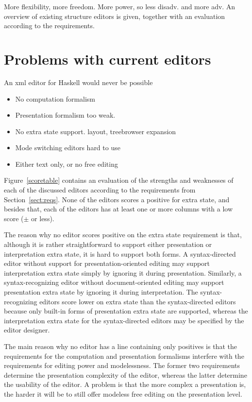 \documentclass{speauth}
\begin{document}
\cbend


 
\bc
More flexibility, more freedom. More power, so less disadv. and more adv. An overview of existing structure editors is given, together with an evaluation according to the requirements. 

\section{Problems with current editors}
An xml editor for Haskell would never be possible
\begin{itemize}
\item No computation formalism
\item Presentation formalism too weak. 
\item No extra state support. layout, treebrowser expansion
\item Mode switching editors hard to use
\item Either text only, or no free editing
\end{itemize}
\ec

Figure~\ref{scoretable} contains an evaluation of the strengths and weaknesses of each of the discussed editors according to the requirements from Section~\ref{sect:reqs}. None of the editors scores a positive for extra state, and besides that, each of the editors has at least one or more columns with a low score ($\pm$ or less). 

The reason why no editor scores positive on the extra state requirement is that, although it is rather straightforward to support either presentation or interpretation extra state, it is hard to support both forms. A syntax-directed editor without support for presentation-oriented editing may support interpretation extra state simply by ignoring it during presentation. Similarly, a syntax-recognizing editor without document-oriented editing may support presentation extra state by ignoring it during interpretation. The syntax-recognizing editors score lower on extra state than the syntax-directed editors because only built-in forms of presentation extra state are supported, whereas the interpretation extra state for the syntax-directed editors may be specified by the editor designer.

The main reason why no editor has a line containing only positives is that the requirements for the computation and presentation formalisms interfere with the requirements for editing power and modelessness. The former two requirements determine the presentation complexity of the editor, whereas the latter determine the usability of the editor. A problem is that the more complex a presentation is, the harder it will be to still offer modeless free editing on the presentation level.
\end{document}
